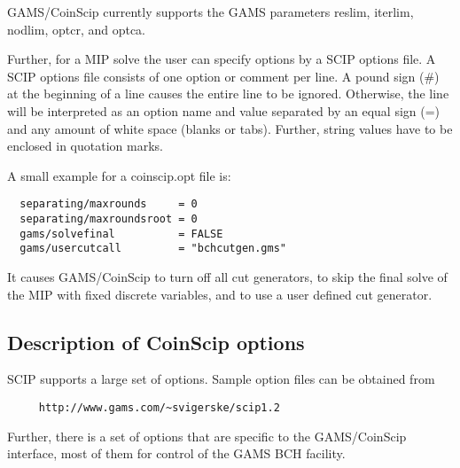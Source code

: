 GAMS/CoinScip currently supports the GAMS parameters reslim, iterlim, nodlim, optcr, and optca.

Further, for a MIP solve the user can specify options by a SCIP options file.
A SCIP options file consists of one option or comment per line.
A pound sign (\#) at the beginning of a line causes the entire line to be ignored.
Otherwise, the line will be interpreted as an option name and value separated by an equal sign (=) and any amount of white space (blanks or tabs).
Further, string values have to be enclosed in quotation marks.

A small example for a coinscip.opt file is:
\begin{verbatim}
  separating/maxrounds     = 0
  separating/maxroundsroot = 0
  gams/solvefinal          = FALSE
  gams/usercutcall         = "bchcutgen.gms"
\end{verbatim}
It causes GAMS/CoinScip to turn off all cut generators, to skip the final solve of the MIP with fixed discrete variables, and to use a user defined cut generator.

\subsection{Description of CoinScip options}

SCIP supports a large set of options.
Sample option files can be obtained from
\begin{verbatim}
     http://www.gams.com/~svigerske/scip1.2
\end{verbatim}

Further, there is a set of options that are specific to the GAMS/CoinScip interface, most of them for control of the GAMS BCH facility.


